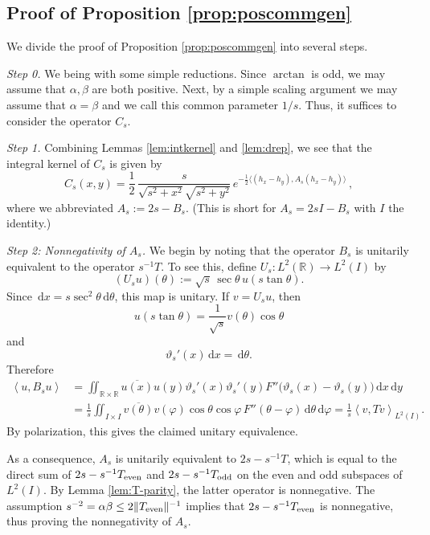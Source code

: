 \documentclass[11pt]{article}
\theoremstyle{definition}
\theoremstyle{remark}
\newcommand{\R}{\mathbb{R}}
\newcommand{\ip}[2]{\left\langle #1,#2\right\rangle}
\newcommand{\dd}{\,\mathrm{d}}
\begin{document}

\subsection*{Proof of Proposition \ref{prop:poscommgen}}

We divide the proof of Proposition \ref{prop:poscommgen} into several steps.

\medskip

\emph{Step 0.} We being with some simple reductions. Since $\arctan$ is odd, we may assume that $\alpha,\beta$ are both positive. Next, by a simple scaling argument we may assume that $\alpha=\beta$ and we call this common parameter $1/s$. Thus, it suffices to consider the operator $C_s$.

\medskip

\emph{Step 1.} Combining Lemmas \ref{lem:intkernel} and \ref{lem:drep}, we see that the integral kernel of $C_s$ is given by
    \begin{equation}
        \label{eq:posommgenproof}
            C_s(x,y) = \frac12 \, \frac{s}{\sqrt{s^2+x^2}\sqrt{s^2+y^2}} \, e^{-\frac12 \langle (h_x-h_y),A_s(h_x-h_y)\rangle} \,,
    \end{equation}
    where we abbreviated $A_s:=2s-B_s$. (This is short for $A_s=2sI-B_s$ with $I$ the identity.)

\medskip

\emph{Step 2: Nonnegativity of $A_s$.}
    We begin by noting that the operator $B_s$ is unitarily equivalent to the operator $s^{-1} T$. To see this, define $U_s:L^2(\R)\to L^2(I)$ by
\begin{equation}\label{eq:Us-def}
(U_su)(\theta):=\sqrt{s}\,\sec\theta\,u(s\tan\theta).
\end{equation}
Since $\dd x=s\sec^2\theta\dd\theta$, this map is unitary.  If $v=U_su$, then
\[
u(s\tan\theta)=\frac{1}{\sqrt{s}}v(\theta)\cos\theta
\]
and
\[
\vartheta_s'(x)\dd x=\dd\theta.
\]
Therefore
\begin{align*}
    \ip{u}{B_su} & = \iint_{\R\times\R}\overline{u(x)}u(y)
\vartheta_s'(x)\vartheta_s'(y)
F''\bigl(\vartheta_s(x)-\vartheta_s(y)\bigr)
\dd x\dd y \\
& = \frac1s \iint_{I\times I} \overline{v(\theta)}v(\varphi) \cos\theta\cos\varphi\,F''(\theta-\varphi) \dd\theta \dd\varphi
= \frac1s\ip{v}{Tv}_{L^2(I)}.
\end{align*}
By polarization, this gives the claimed unitary equivalence.

As a consequence, $A_s$ is unitarily equivalent to $2s - s^{-1}T$, which is equal to the direct sum of $2s-s^{-1}T_{\rm even}$ and $2s-s^{-1} T_{\rm odd}$ on the even and odd subspaces of $L^2(I)$. By Lemma \ref{lem:T-parity}, the latter operator is nonnegative. The assumption $s^{-2} = \alpha\beta\leq 2\|T_{\rm even}\|^{-1}$ implies that $2s-s^{-1}T_{\rm even}$ is nonnegative, thus proving the nonnegativity of $A_s$.
\end{document}
